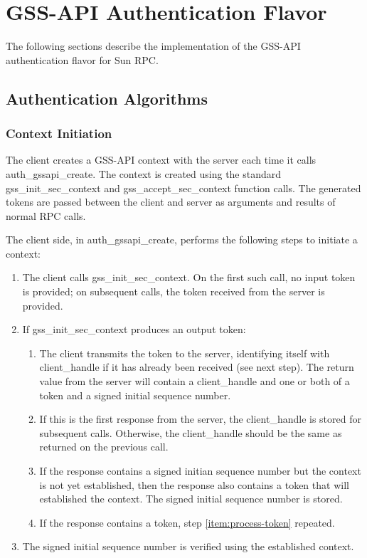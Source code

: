 \section{GSS-API Authentication Flavor}

The following sections describe the implementation of the GSS-API
authentication flavor for Sun RPC.

\subsection{Authentication Algorithms}
\label{sec:algorithms}

\subsubsection{Context Initiation}

The client creates a GSS-API context with the server each time it
calls auth_gssapi_create.  The context is created using the standard
gss_init_sec_context and gss_accept_sec_context function calls.  The
generated tokens are passed between the client and server as arguments
and results of normal RPC calls.

The client side, in auth_gssapi_create, performs the following steps
to initiate a context:

\begin{enumerate}
\item\label{item:process-token} The client calls gss_init_sec_context.
On the first such call, no input token is provided; on subsequent
calls, the token received from the server is provided.

\item If gss_init_sec_context produces an output token:

\begin{enumerate}
\item The client transmits the token to the server, identifying itself
with client_handle if it has already been received (see next step).
The return value from the server will contain a client_handle and one
or both of a token and a signed initial sequence number.

\item If this is the first response from the server, the client_handle
is stored for subsequent calls.  Otherwise, the client_handle should be
the same as returned on the previous call.

\item If the response contains a signed initian sequence number but
the context is not yet established, then the response also contains a
token that will established the context.  The signed initial sequence
number is stored.

\item If the response contains a token, step \ref{item:process-token}
repeated.
\end{enumerate}

\item The signed initial sequence number is verified using the
established context.
\end{enumerate}

